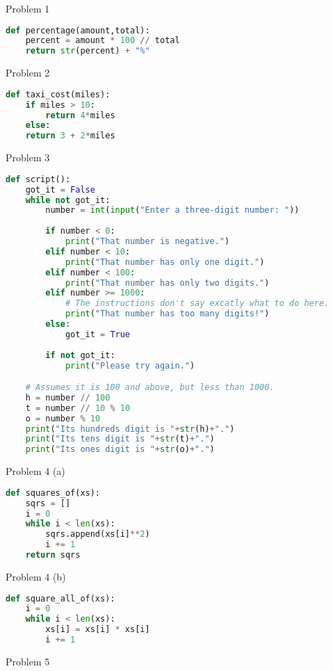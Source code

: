 \documentclass{article}
\begin{document}
Problem 1

\begin{lstlisting}[language=Python]
def percentage(amount,total):
    percent = amount * 100 // total
    return str(percent) + "%"
\end{lstlisting}

\bigskip
Problem 2

\begin{lstlisting}[language=Python]
def taxi_cost(miles):
    if miles > 10:
        return 4*miles
    else:
    return 3 + 2*miles
\end{lstlisting}

\bigskip
Problem 3

\begin{lstlisting}[language=Python]
def script():
    got_it = False
    while not got_it:
        number = int(input("Enter a three-digit number: "))
        
        if number < 0:
            print("That number is negative.")
        elif number < 10:
            print("That number has only one digit.")
        elif number < 100:
            print("That number has only two digits.")
        elif number >= 1000:
            # The instructions don't say excatly what to do here. 
            print("That number has too many digits!")
        else:
            got_it = True
            
        if not got_it:
            print("Please try again.")

    # Assumes it is 100 and above, but less than 1000.
    h = number // 100
    t = number // 10 % 10
    o = number % 10
    print("Its hundreds digit is "+str(h)+".")
    print("Its tens digit is "+str(t)+".")
    print("Its ones digit is "+str(o)+".")
\end{lstlisting}


\newpage
Problem 4 (a)

\begin{lstlisting}[language=Python]
def squares_of(xs):
    sqrs = []
    i = 0
    while i < len(xs):
        sqrs.append(xs[i]**2)
        i += 1
    return sqrs
\end{lstlisting}

\bigskip
Problem 4 (b)

\begin{lstlisting}[language=Python]
def square_all_of(xs):
    i = 0
    while i < len(xs):
        xs[i] = xs[i] * xs[i]
        i += 1
\end{lstlisting}

\bigskip
Problem 5
\end{document}
